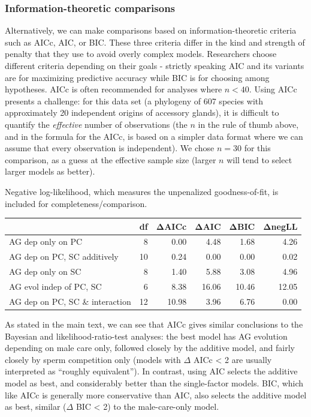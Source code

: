 \documentclass[
]{article}
\begin{document}
\hypertarget{information-theoretic-comparisons}{%
\subsubsection{Information-theoretic
comparisons}\label{information-theoretic-comparisons}}

Alternatively, we can make comparisons based on information-theoretic
criteria such as AICc, AIC, or BIC. These three criteria differ in the
kind and strength of penalty that they use to avoid overly complex
models. Researchers choose different criteria depending on their goals -
strictly speaking AIC and its variants are for maximizing predictive
accuracy while BIC is for choosing among hypotheses. AICc is often
recommended for analyses where \(n<40\). Using AICc presents a
challenge: for this data set (a phylogeny of 607 species with
approximately 20 independent origins of accessory glands), it is
difficult to quantify the \emph{effective} number of observations (the
\(n\) in the rule of thumb above, and in the formula for the AICc, is
based on a simpler data format where we can assume that every
observation is independent). We chose \(n=30\) for this comparison, as a
guess at the effective sample size (larger \(n\) will tend to select
larger models as better).

Negative log-likelihood, which measures the unpenalized goodness-of-fit,
is included for completeness/comparison.

\begin{longtable}[]{@{}lrrrrr@{}}
\toprule()
& df & ΔAICc & ΔAIC & ΔBIC & ΔnegLL \\
\midrule()
\endhead
AG dep only on PC & 8 & 0.00 & 4.48 & 1.68 & 4.26 \\
AG dep on PC, SC additively & 10 & 0.24 & 0.00 & 0.00 & 0.02 \\
AG dep only on SC & 8 & 1.40 & 5.88 & 3.08 & 4.96 \\
AG evol indep of PC, SC & 6 & 8.38 & 16.06 & 10.46 & 12.05 \\
AG dep on PC, SC \& interaction & 12 & 10.98 & 3.96 & 6.76 & 0.00 \\
\bottomrule()
\end{longtable}

As stated in the main text, we can see that AICc gives similar
conclusions to the Bayesian and likelihood-ratio-test analyses: the best
model has AG evolution depending on male care only, followed closely by
the additive model, and fairly closely by sperm competition only (models
with \(\Delta\) AICc \textless{} 2 are usually interpreted as ``roughly
equivalent''). In contrast, using AIC selects the additive model as
best, and considerably better than the single-factor models. BIC, which
like AICc is generally more conservative than AIC, also selects the
additive model as best, similar (\(\Delta\) BIC \textless{} 2) to the
male-care-only model.
\end{document}
